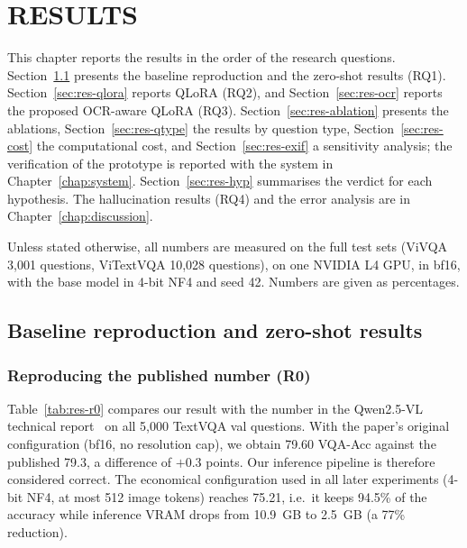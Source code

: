 
\chapter{RESULTS}
\label{chap:results}

\ifpdf
    \graphicspath{{Chapter6/Figs/Raster/}{Chapter6/Figs/PDF/}{Chapter6/Figs/}}
\else
    \graphicspath{{Chapter6/Figs/Vector/}{Chapter6/Figs/}}
\fi

This chapter reports the results in the order of the research questions.
Section~\ref{sec:res-repro} presents the baseline reproduction and the zero-shot results
(RQ1). Section~\ref{sec:res-qlora} reports QLoRA (RQ2), and Section~\ref{sec:res-ocr}
reports the proposed OCR-aware QLoRA (RQ3). Section~\ref{sec:res-ablation} presents the
ablations, Section~\ref{sec:res-qtype} the results by question type,
Section~\ref{sec:res-cost} the computational cost, and Section~\ref{sec:res-exif} a
sensitivity analysis; the verification of the prototype is reported with the system in
Chapter~\ref{chap:system}. Section~\ref{sec:res-hyp} summarises the verdict for each hypothesis. The
hallucination results (RQ4) and the error analysis are in Chapter~\ref{chap:discussion}.

Unless stated otherwise, all numbers are measured on the full test sets (ViVQA 3,001
questions, ViTextVQA 10,028 questions), on one NVIDIA L4 GPU, in bf16, with the base
model in 4-bit NF4 and seed 42. Numbers are given as percentages.

\section{Baseline reproduction and zero-shot results}
\label{sec:res-repro}

\subsection{Reproducing the published number (R0)}

Table~\ref{tab:res-r0} compares our result with the number in the Qwen2.5-VL
technical report~\cite{bai2025qwen25vl} on all 5,000 TextVQA val questions. With the
paper's original configuration (bf16, no resolution cap), we obtain 79.60 VQA-Acc
against the published 79.3, a difference of $+0.3$ points. Our inference pipeline
is therefore considered correct. The economical configuration used in all later
experiments (4-bit NF4, at most 512 image tokens) reaches 75.21, i.e.\ it keeps 94.5\% of
the accuracy while inference VRAM drops from 10.9~GB to 2.5~GB (a 77\% reduction).

